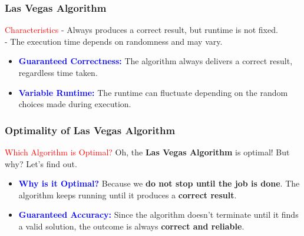 \begin{frame}
    \frametitle{Las Vegas Algorithm}
    \vspace{0.4cm} %
    
    \begin{block}{\textcolor{red}{Characteristics}}
        - Always produces a correct result, but runtime is not fixed. \\
        - The execution time depends on randomness and may vary.
    \end{block}
    \vspace{0.4cm} %

    \begin{itemize}
        \item \textbf{\textcolor{blue}{Guaranteed Correctness:}} 
        The algorithm always delivers a correct result, regardless time taken.
        \vspace{0.3cm} %
        
        \item \textbf{\textcolor{blue}{Variable Runtime:}} 
        The runtime can fluctuate depending on the random choices made during execution.
    \end{itemize}
    
    \vspace{0.5cm} %
\end{frame}


\begin{frame}
    \frametitle{Optimality of Las Vegas Algorithm}
    \vspace{0.4cm} %

    \begin{block}{\textcolor{red}{Which Algorithm is Optimal?}}
        Oh, the \textbf{Las Vegas Algorithm} is optimal! But why? Let's find out.
    \end{block}
    \vspace{0.4cm} %

    \begin{itemize}
        \item \textbf{\textcolor{blue}{Why is it Optimal?}} 
        Because we \textbf{do not stop until the job is done}. The algorithm keeps running until it produces a \textbf{correct result}.
        \vspace{0.3cm} %
        
        \item \textbf{\textcolor{blue}{Guaranteed Accuracy:}} 
        Since the algorithm doesn't terminate until it finds a valid solution, the outcome is always \textbf{correct and reliable}.
    \end{itemize}
    
    \vspace{0.5cm} %
\end{frame}


